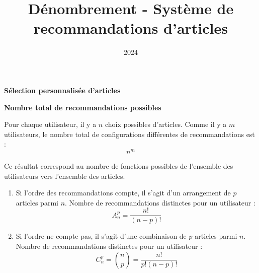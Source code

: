 \documentclass[10pt,a4paper]{article}
\title{Dénombrement - Système de recommandations d'articles}
\author{}
\date{2024}
\begin{document}

\q \textbf{Sélection personnalisée d'articles}

    \textbf{Nombre total de recommandations possibles}

    Pour chaque utilisateur, il y a $n$ choix possibles d'articles. Comme il y a $m$ utilisateurs, le
    nombre total de configurations différentes de recommandations est :
    $$ n^m $$

    Ce résultat correspond au nombre de fonctions possibles de l'ensemble des utilisateurs vers
    l'ensemble des articles.

   \begin{enumerate}

      \item  Si l'ordre des recommandations compte, il s'agit d'un arrangement de $p$ articles parmi
      $n$. Nombre de recommandations distinctes pour un utilisateur :
      $$ A_n^p = \frac{n!}{(n-p)!} $$

      \item Si l'ordre ne compte pas, il s'agit d'une combinaison de $p$ articles parmi $n$.
      Nombre de recommandations distinctes pour un utilisateur :
      $$ C_n^p = \binom{n}{p} = \frac{n!}{p!(n-p)!} $$
    \end{enumerate}
\end{document}
